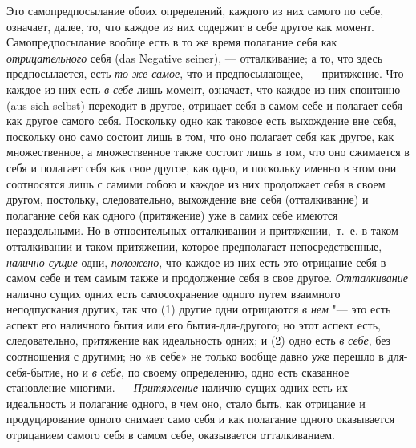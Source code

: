 Это самопредпосылание обоих определений, каждого из них самого по себе,
означает, далее, то, что каждое из них содержит в себе другое как момент.
Самопредпосылание вообще есть в то же время полагание себя как
{\em отрицательного} себя (das Negative seiner), —
отталкивание; а то, что здесь предпосылается, есть
{\em то же самое}, что и предпосылающее, — притяжение.
Что каждое из них есть {\em в себе} лишь момент,
означает, что каждое из них спонтанно (aus sich selbst) переходит в
другое, отрицает себя в самом себе и полагает себя как другое самого себя.
Поскольку одно как таковое есть выхождение вне себя, поскольку оно само
состоит лишь в том, что оно полагает себя как другое, как множественное, а
множественное также состоит лишь в том, что оно сжимается в себя и полагает
себя как свое другое, как одно, и поскольку именно в этом они соотносятся
лишь с самими собою и каждое из них продолжает себя в своем другом,
постольку, следовательно, выхождение вне себя (отталкивание) и полагание
себя как одного (притяжение) уже в самих себе имеются нераздельными. Но в
относительных отталкивании и притяжении,~т.~е. в таком отталкивании и таком
притяжении, которое предполагает непосредственные,
{\em налично сущие} одни,
{\em положено}, что каждое из них есть это отрицание
себя в самом себе и тем самым также и продолжение себя в свое другое.
{\em Отталкивание} налично сущих одних есть
самосохранение одного путем взаимного неподпускания других, так что (1)
другие одни отрицаются {\em в нем} "--- это есть аспект
его наличного бытия или его бытия-для-другого; но этот аспект есть,
следовательно, притяжение как идеальность одних; и (2) одно есть
{\em в себе}, без соотношения с другими; но «в себе» не
только вообще давно уже перешло в для-себя-бытие, но и
{\em в себе}, по своему определению, одно есть
сказанное становление многими. — {\em Притяжение}
налично сущих одних есть их идеальность и полагание одного, в чем оно,
стало быть, как отрицание и продуцирование одного снимает само себя и как
полагание одного оказывается отрицанием самого себя в самом себе,
оказывается отталкиванием.

